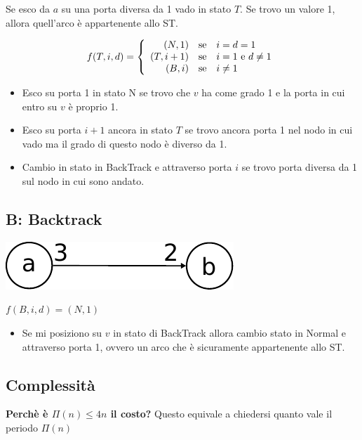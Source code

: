 Se esco da $a$ su una porta diversa da 1 vado in stato $T$. Se trovo un valore 1, allora quell'arco è appartenente allo ST.

\begin{equation}
  f(T,i,d) =
  \left\{
  \begin{array}{r
      @{\quad{\mbox{se}}\quad}
      l}
     (N,1) & i = d = 1 \\
     (T,i+1) & i = 1 ~\textrm{e}~ d \neq 1 \\
     (B,i) & i \neq 1 \\
  \end{array}
  \right.
\end{equation}
\begin{itemize}
    \item Esco su porta 1 in stato N se trovo che $v$ ha come grado 1 e la porta in cui entro su $v$ è proprio 1.
    \item Esco su porta $i+1$ ancora in stato $T$ se trovo ancora porta 1 nel nodo in cui vado ma il grado di questo nodo è diverso da 1.
    \item Cambio in stato in BackTrack e attraverso porta $i$ se trovo porta diversa da 1 sul nodo in cui sono andato.
\end{itemize}


\subsection{B: Backtrack}
\begin{center}
  \includegraphics[scale=0.7]{images/n_28-2}
\end{center}

\begin{center}
  $f(B,i,d) = (N,1)$
\end{center}

\begin{itemize}
    \item Se mi posiziono su $v$ in stato di BackTrack allora cambio stato in Normal e attraverso porta 1, ovvero un arco che è sicuramente appartenente allo ST.
\end{itemize}

\subsection{Complessità}
\textbf{Perchè è $\Pi(n) \leq 4n$ il costo?} Questo equivale a chiedersi quanto vale il periodo $\Pi(n)$\\

